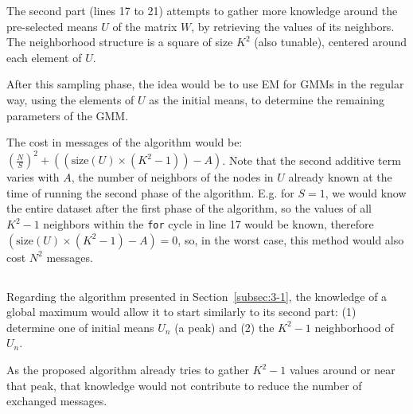 \documentclass[paper=a4, fontsize=11pt]{scrartcl} %
\numberwithin{equation}{section} %
\numberwithin{figure}{section} %
\numberwithin{table}{section} %
\newcommand{\vertbreak}{\vspace{1.75 mm}}
\begin{document}
The second part (lines 17 to 21) attempts to gather more knowledge around the 
pre-selected means $U$ of the matrix $W$, by retrieving the values of its 
neighbors. The neighborhood structure is a square of size $K^2$ (also tunable), 
centered around each element of $U$.\vertbreak

After this sampling phase, the idea would be to use EM for GMMs in the regular 
way, using the elements of $U$ as the initial means, to determine the remaining 
parameters of the GMM.\vertbreak

The cost in messages of the algorithm would be: $(\frac{N}{S})^2 + 
((\text{size}(U) \times (K^2 - 1)) - A)$. Note that the second additive term varies with $A$, 
the number of neighbors of the nodes in $U$ already known at the time of running the second phase
 of the algorithm. E.g. for $S = 1$, we would know the entire dataset after the first phase of 
the algorithm, so the values of all $K^2 - 1$ neighbors within the \verb+for+ cycle in line 17 
would be known, therefore $(\text{size}(U) \times (K^2 - 1) - A) = 0$, so, in the 
worst case, this method would also cost $N^2$ messages.

\subsection{}
\label{subsec:3-2}

Regarding the algorithm presented in Section~\ref{subsec:3-1}, the knowledge of 
a global maximum would allow it to start similarly to its second part: 
(1) determine one of initial means $U_n$ (a peak) and (2) the $K^2 - 1$ 
neighborhood of $U_n$.\vertbreak

As the proposed algorithm already tries to gather $K^2 - 1$ values around or 
near that peak, that knowledge would not contribute to reduce the number of 
exchanged messages.



\end{document}
